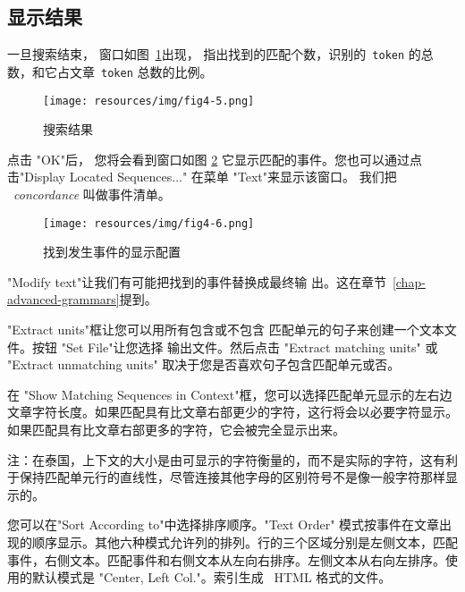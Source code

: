 \subsection{显示结果}
\label{section-display-occurrences}
一旦搜索结束， 窗口如图~\ref{fig-search-results}出现， 指出找到的匹配个数，识别的\ \verb+token+ 的总数，和它占文章\ \verb+token+ 总数的比例。


\bigskip
\begin{figure}[h]
\begin{center}
\texttt{[image: resources/img/fig4-5.png]}
\caption{搜索结果 \label{fig-search-results}}
\end{center}
\end{figure}

\noindent 点击 "OK"后， 您将会看到窗口如图
\ref{fig-configuration-concordance} 它显示匹配的事件。您也可以通过点击"Display Located Sequences..." 在菜单 "Text"来显示该窗口。
我们把 \ \textit{concordance} 叫做事件清单。


\bigskip
\begin{figure}[h]
\begin{center}
\texttt{[image: resources/img/fig4-6.png]}
\caption{找到发生事件的显示配置\label{fig-configuration-concordance}}
\end{center}
\end{figure}

\bigskip
\noindent "Modify text"让我们有可能把找到的事件替换成最终输
出。这在章节~\ref{chap-advanced-grammars}提到。

\bigskip
\noindent  "Extract units"框让您可以用所有包含或不包含
匹配单元的句子来创建一个文本文件。按钮 "Set File"让您选择
输出文件。然后点击 "Extract matching units" 或 "Extract unmatching units" 取决于您是否喜欢句子包含匹配单元或否。


\bigskip
\noindent 在 "Show Matching Sequences in Context"框，您可以选择匹配单元显示的左右边文章字符长度。如果匹配具有比文章右部更少的字符，这行将会以必要字符显示。如果匹配具有比文章右部更多的字符，它会被完全显示出来。 


\bigskip
\noindent 注：在泰国，上下文的大小是由可显示的字符衡量的，而不是实际的字符，这有利于保持匹配单元行的直线性，尽管连接其他字母的区别符号不是像一般字符那样显示的。 


\bigskip
\noindent 您可以在"Sort According to"中选择排序顺序。"Text Order" 模式按事件在文章出现的顺序显示。其他六种模式允许列的排列。行的三个区域分别是左侧文本，匹配事件，右侧文本。匹配事件和右侧文本从左向右排序。左侧文本从右向左排序。使用的默认模式是 "Center, Left Col."。索引生成 \ HTML
格式的文件。

